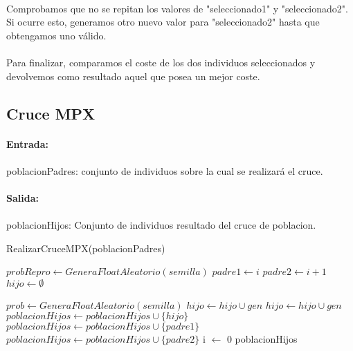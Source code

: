 	\paragraph{}Comprobamos que no se repitan los valores de "seleccionado1" y "seleccionado2". Si ocurre esto, generamos otro nuevo valor para "seleccionado2" hasta que obtengamos uno válido.
	
	\paragraph{}Para finalizar, comparamos el coste de los dos individuos seleccionados y devolvemos como resultado aquel que posea un mejor coste.
	
	\subsection{Cruce MPX}
	
	\paragraph{Entrada:}
	
	\paragraph{}poblacionPadres: conjunto de individuos sobre la cual se realizará el cruce.
	
	\paragraph{Salida:}
	
	\paragraph{}poblacionHijos: Conjunto de individuos resultado del cruce de poblacion.

	\begin{algorithm}[H]
		\caption{RealizarCruceMPX(poblacionPadres)}
		\begin{algorithmic}
				\STATE $probRepro \leftarrow GeneraFloatAleatorio(semilla)$
				\STATE $padre1 \leftarrow i$
				\STATE $padre2 \leftarrow i+1$
					\STATE $hijo \leftarrow \emptyset $
					
						\STATE $prob \leftarrow GeneraFloatAleatorio(semilla)$
							\STATE $hijo \leftarrow hijo\cup gen$
						\ENDIF
					\ENDFOR
						\STATE $hijo \leftarrow hijo\cup gen$
					\ENDFOR
					\STATE $poblacionHijos \leftarrow poblacionHijos\cup\{hijo\}$
				\ELSE
					\STATE $poblacionHijos \leftarrow poblacionHijos\cup\{padre1\}$
						\STATE $poblacionHijos \leftarrow poblacionHijos\cup\{padre2\}$
					\ENDIF
				\ENDIF
					\STATE i $\leftarrow$ 0
				\ENDIF
			\ENDFOR
			\RETURN poblacionHijos
		\end{algorithmic}
	\end{algorithm}

